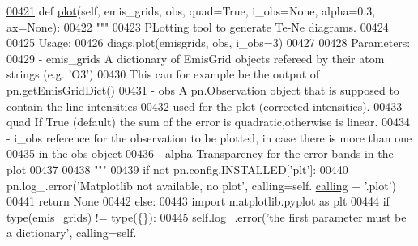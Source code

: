 \begin{DoxyCode}
\hypertarget{classpyneb_1_1core_1_1diags_1_1_diagnostics_l00421}{}\hyperlink{classpyneb_1_1core_1_1diags_1_1_diagnostics_af8b435b5fd63db75d207a7d1327ce65a}{00421}     \textcolor{keyword}{def }\hyperlink{classpyneb_1_1core_1_1diags_1_1_diagnostics_af8b435b5fd63db75d207a7d1327ce65a}{plot}(self, emis\_grids, obs, quad=True, i\_obs=None, alpha=0.3, ax=None):
00422         \textcolor{stringliteral}{"""}
00423 \textcolor{stringliteral}{        PLotting tool to generate Te-Ne diagrams.}
00424 \textcolor{stringliteral}{        }
00425 \textcolor{stringliteral}{        Usage:}
00426 \textcolor{stringliteral}{            diags.plot(emisgrids, obs, i\_obs=3)}
00427 \textcolor{stringliteral}{            }
00428 \textcolor{stringliteral}{        Parameters:}
00429 \textcolor{stringliteral}{            - emis\_grids    A dictionary of EmisGrid objects refereed by their atom strings (e.g. 'O3')}
00430 \textcolor{stringliteral}{                            This can for example be the output of pn.getEmisGridDict()}
00431 \textcolor{stringliteral}{            - obs           A pn.Observation object that is supposed to contain the line intensities}
00432 \textcolor{stringliteral}{                            used for the plot (corrected intensities).}
00433 \textcolor{stringliteral}{            - quad          If True (default) the sum of the error is quadratic,otherwise is linear.}
00434 \textcolor{stringliteral}{            - i\_obs         reference for the observation to be plotted, in case there is more than one}
00435 \textcolor{stringliteral}{                            in the obs object}
00436 \textcolor{stringliteral}{            - alpha         Transparency for the error bands in the plot}
00437 \textcolor{stringliteral}{            }
00438 \textcolor{stringliteral}{        """}
00439         \textcolor{keywordflow}{if} \textcolor{keywordflow}{not} pn.config.INSTALLED[\textcolor{stringliteral}{'plt'}]: 
00440             pn.log\_.error(\textcolor{stringliteral}{'Matplotlib not available, no plot'}, calling=self.
      \hyperlink{classpyneb_1_1core_1_1diags_1_1_diagnostics_a07dce673fec8b2383ef411ab94b0b2fe}{calling} + \textcolor{stringliteral}{'.plot'})
00441             \textcolor{keywordflow}{return} \textcolor{keywordtype}{None}
00442         \textcolor{keywordflow}{else}:
00443             \textcolor{keyword}{import} matplotlib.pyplot \textcolor{keyword}{as} plt
00444         \textcolor{keywordflow}{if} type(emis\_grids) != type(\{\}):
00445             self.log\_.error(\textcolor{stringliteral}{'the first parameter must be a dictionary'}, calling=self.

\end{DoxyCode}
